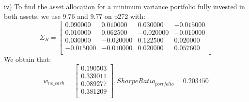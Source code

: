 \documentclass{article}
\begin{document}
iv) To find the asset allocation for a minimum variance portfolio fully invested in both assets, we use 9.76 and 9.77 on p272 with:
\begin{equation*}
\Sigma_{R}=%
\begin{bmatrix}{}
 0.090000 & 0.010000 & 0.030000 & -0.015000 \\ 
  0.010000 & 0.062500 & -0.020000 & -0.010000 \\ 
  0.030000 & -0.020000 & 0.122500 & 0.020000 \\ 
  -0.015000 & -0.010000 & 0.020000 & 0.057600 \\ 
  \end{bmatrix}
\end{equation*}
We obtain that:
\begin{equation*}
w_{no\_cash} =%
\begin{bmatrix}{}
 0.190503 \\ 
  0.339011 \\ 
  0.089277 \\ 
  0.381209 \\ 
  \end{bmatrix},
{Sharpe Ratio}_{portfolio} = 0.203450
\end{equation*}
\end{document}
